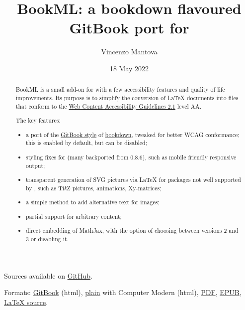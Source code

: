 \documentclass[a4paper,british]{article}
\title{BookML: a bookdown flavoured GitBook port for \texorpdfstring{\LaTeXML{}}{LaTeXML}}
\author{Vincenzo Mantova}
\date{18 May 2022}
\def\Xy{Xy}
\def\tikzname{Ti\emph{k}Z}
\begin{document}
\maketitle

\begin{abstract}
  BookML is a small add-on for \LaTeXML{} with a few accessibility features and quality of life improvements. Its purpose is to simplify the conversion of \LaTeX{} documents into \HTML{} files that conform to the \href{https://www.w3.org/TR/WCAG21/}{Web Content Accessibility Guidelines 2.1} level AA.

  The key features:
  \begin{itemize}
    \item a port of the \href{https://bookdown.org/yihui/bookdown/html.html#gitbook-style}{GitBook style} of \href{https://bookdown.org}{bookdown}, tweaked for better WCAG conformance; this is enabled by default, but can be disabled;
    \item styling fixes for \LaTeXML{} (many backported from 0.8.6), such as mobile friendly responsive output;
    \item transparent generation of SVG pictures via \LaTeX{} for packages not well supported by \LaTeXML{}, such as \tikzname{} pictures, animations, \Xy-matrices;
    \item a simple method to add alternative text for images;
    \item partial support for arbitrary \HTML{} content;
    \item direct embedding of MathJax, with the option of choosing between versions 2 and 3 or disabling it.
  \end{itemize}
\end{abstract}

\begin{center}

  Sources available on \href{https://github.com/vlmantova/bookml/}{GitHub}.

  Formats: \href{https://vlmantova.github.io/bookml/}{GitBook} (html), \href{https://vlmantova.github.io/bookml/index.plain.html}{plain} with Computer Modern (html), \href{https://vlmantova.github.io/bookml/docs.pdf}{PDF}, \href{https://vlmantova.github.io/bookml/docs.epub}{EPUB}, \href{https://github.com/vlmantova/bookml/blob/docs/docs.tex}{\LaTeX{} source}.
\end{center}
\end{document}
